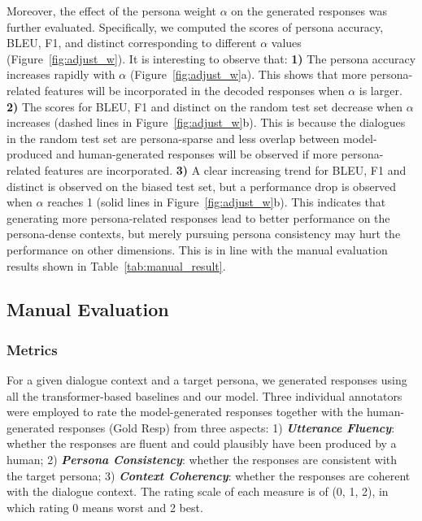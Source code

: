 \documentclass[letterpaper]{article}
\begin{document}
Moreover, the effect of the persona weight $\alpha$ on the generated responses was further evaluated. Specifically, we computed the scores of persona accuracy, BLEU, F1, and distinct corresponding to different $\alpha$ values (Figure~\ref{fig:adjust_w}). It is interesting to observe that:
\textbf{1)} The persona accuracy increases rapidly with $\alpha$ (Figure~\ref{fig:adjust_w}a). This shows that more persona-related features will be incorporated in the decoded responses when $\alpha$ is larger.
\textbf{2)} The scores for BLEU, F1 and distinct on the random test set decrease when $\alpha$ increases (dashed lines in Figure~\ref{fig:adjust_w}b). This is because the dialogues in the random test set are persona-sparse and less overlap between model-produced and human-generated responses will be observed if more persona-related features are incorporated.
\textbf{3)} A clear increasing trend for BLEU, F1 and distinct is observed on the biased test set, but a performance drop is observed when $\alpha$ reaches 1 (solid lines in Figure~\ref{fig:adjust_w}b). This indicates that generating more persona-related responses lead to better performance on the persona-dense contexts, but merely pursuing persona consistency may hurt the performance on other dimensions. This is in line with the manual evaluation results shown in Table~\ref{tab:manual_result}.

\subsection{Manual Evaluation}
\subsubsection{Metrics}
For a given dialogue context and a target persona, we generated responses using all the transformer-based baselines and our model. Three individual annotators were employed to rate the model-generated responses together with the human-generated responses (Gold Resp) from three aspects:
1) \emph{\textbf{Utterance Fluency}}: whether the responses are fluent and could plausibly have been produced by a human;
2) \emph{\textbf{Persona Consistency}}: whether the responses are consistent with the target persona;
3) \emph{\textbf{Context Coherency}}: whether the responses are coherent with the dialogue context.
The rating scale of each measure is of (0, 1, 2), in which rating 0 means worst and 2 best.
\end{document}
